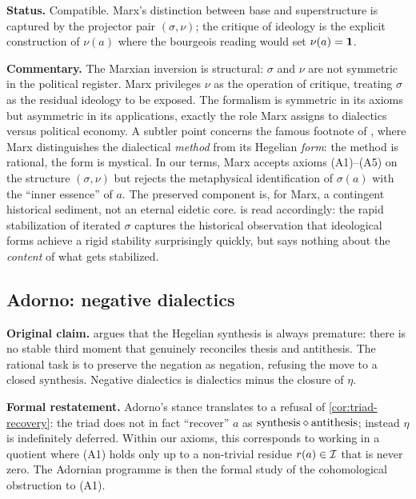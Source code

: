 \textbf{Status.} Compatible. Marx's distinction between base and
superstructure is captured by the projector pair $(\sigma,\nu)$;
the critique of ideology is the explicit construction of $\nu(a)$
where the bourgeois reading would set $\nu(a)=\mathbf{1}$.

\textbf{Commentary.} The Marxian inversion is structural: $\sigma$
and $\nu$ are not symmetric in the political register. Marx
privileges $\nu$ as the operation of critique, treating $\sigma$ as
the residual ideology to be exposed. The formalism is symmetric in
its axioms but asymmetric in its applications, exactly the role Marx
assigns to dialectics versus political economy.  A subtler point
concerns the famous footnote of \citet[postface to the second
edition]{Marx1867}, where Marx distinguishes the dialectical
\emph{method} from its Hegelian \emph{form}: the method is rational,
the form is mystical. In our terms, Marx accepts axioms (A1)--(A5)
on the structure $(\sigma,\nu)$ but rejects the metaphysical
identification of $\sigma(a)$ with the ``inner essence'' of $a$.
The preserved component is, for Marx, a contingent historical
sediment, not an eternal eidetic core.  is
read accordingly: the rapid stabilization of iterated $\sigma$
captures the historical observation that ideological forms achieve a
rigid stability surprisingly quickly, but says nothing about the
\emph{content} of what gets stabilized.

\subsection*{Adorno: negative dialectics}

\textbf{Original claim.} \citet{Adorno1966} argues that the Hegelian
synthesis is always premature: there is no stable third moment that
genuinely reconciles thesis and antithesis. The rational task is to
preserve the negation as negation, refusing the move to a closed
$\mathrm{synthesis}$. Negative dialectics is dialectics minus the closure of
$\eta$.

\textbf{Formal restatement.} Adorno's stance translates to a refusal
of \cref{cor:triad-recovery}: the triad does not in fact ``recover''
$a$ as $\mathrm{synthesis}\mathbin{\diamond}\mathrm{antithesis}$; instead $\eta$ is
indefinitely deferred. Within our axioms, this corresponds to working
in a quotient where (A1) holds only up to a non-trivial residue
$r(a)\in\mathcal{I}$ that is never zero. The Adornian programme is then
the formal study of the cohomological obstruction to (A1).

